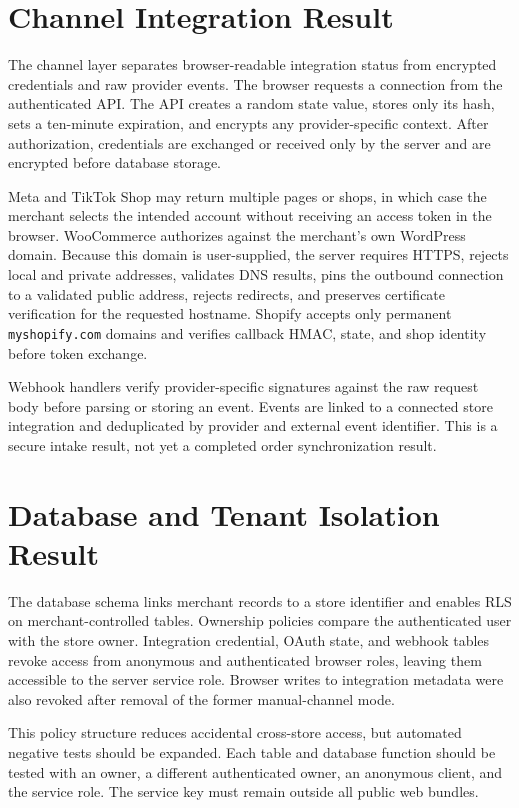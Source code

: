 \documentclass[12pt,oneside]{report}
\begin{document}
\section{Channel Integration Result}
The channel layer separates browser-readable integration status from encrypted
credentials and raw provider events. The browser requests a connection from the
authenticated API. The API creates a random state value, stores only its hash,
sets a ten-minute expiration, and encrypts any provider-specific context. After
authorization, credentials are exchanged or received only by the server and
are encrypted before database storage.

Meta and TikTok Shop may return multiple pages or shops, in which case the
merchant selects the intended account without receiving an access token in the
browser. WooCommerce authorizes against the merchant's own WordPress domain.
Because this domain is user-supplied, the server requires HTTPS, rejects local
and private addresses, validates DNS results, pins the outbound connection to a
validated public address, rejects redirects, and preserves certificate
verification for the requested hostname. Shopify accepts only permanent
\texttt{myshopify.com} domains and verifies callback HMAC, state, and shop
identity before token exchange.

Webhook handlers verify provider-specific signatures against the raw request
body before parsing or storing an event. Events are linked to a connected store
integration and deduplicated by provider and external event identifier. This is
a secure intake result, not yet a completed order synchronization result.

\section{Database and Tenant Isolation Result}
The database schema links merchant records to a store identifier and enables RLS
on merchant-controlled tables. Ownership policies compare the authenticated
user with the store owner. Integration credential, OAuth state, and webhook
tables revoke access from anonymous and authenticated browser roles, leaving
them accessible to the server service role. Browser writes to integration
metadata were also revoked after removal of the former manual-channel mode.

This policy structure reduces accidental cross-store access, but automated
negative tests should be expanded. Each table and database function should be
tested with an owner, a different authenticated owner, an anonymous client, and
the service role. The service key must remain outside all public web bundles.
\end{document}
